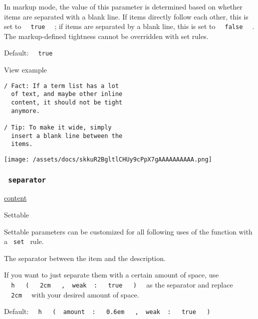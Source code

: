 In markup mode, the value of this parameter is determined based on
whether items are separated with a blank line. If items directly follow
each other, this is set to \texttt{\ }{\texttt{\ true\ }}\texttt{\ } ;
if items are separated by a blank line, this is set to
\texttt{\ }{\texttt{\ false\ }}\texttt{\ } . The markup-defined
tightness cannot be overridden with set rules.

Default: \texttt{\ }{\texttt{\ true\ }}\texttt{\ }


View example

\begin{verbatim}
/ Fact: If a term list has a lot
  of text, and maybe other inline
  content, it should not be tight
  anymore.

/ Tip: To make it wide, simply
  insert a blank line between the
  items.
\end{verbatim}

\texttt{[image: /assets/docs/skkuR2BgltlCHUy9cPpX7gAAAAAAAAAA.png]}

\subsubsection{\texorpdfstring{\texttt{\ separator\ }}{ separator }}\label{parameters-separator}

\href{/docs/reference/foundations/content/}{content}

{{ Settable }}

\label{parameters-separator-settable-tooltip}
Settable parameters can be customized for all following uses of the
function with a \texttt{\ set\ } rule.

The separator between the item and the description.

If you want to just separate them with a certain amount of space, use
\texttt{\ }{\texttt{\ h\ }}\texttt{\ }{\texttt{\ (\ }}\texttt{\ }{\texttt{\ 2cm\ }}\texttt{\ }{\texttt{\ ,\ }}\texttt{\ weak\ }{\texttt{\ :\ }}\texttt{\ }{\texttt{\ true\ }}\texttt{\ }{\texttt{\ )\ }}\texttt{\ }
as the separator and replace \texttt{\ }{\texttt{\ 2cm\ }}\texttt{\ }
with your desired amount of space.

Default:
\texttt{\ }{\texttt{\ h\ }}\texttt{\ }{\texttt{\ (\ }}\texttt{\ amount\ }{\texttt{\ :\ }}\texttt{\ }{\texttt{\ 0.6em\ }}\texttt{\ }{\texttt{\ ,\ }}\texttt{\ weak\ }{\texttt{\ :\ }}\texttt{\ }{\texttt{\ true\ }}\texttt{\ }{\texttt{\ )\ }}\texttt{\ }

